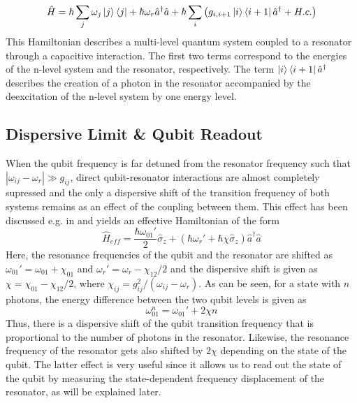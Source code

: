 %
\begin{equation}
\hat{H} = \hbar \sum\limits_j \omega_j \left| j \right>\left< j \right|+\hbar \omega_r \hat{a}^\dagger \hat{a} + \hbar \sum\limits_i \left(g_{i,i+1} \left| i \right>\left< i+1 \right|\hat{a}^\dagger +H.c.\right) \label{eq:cqed_rotating_wave}
\end{equation}
%
This Hamiltonian describes a multi-level quantum system coupled to a resonator through a capacitive interaction. The first two terms correspond to the energies of the n-level system and the resonator, respectively. The term $\left| i \right>\left< i+1 \right|\hat{a}^\dagger$ describes the creation of a photon in the resonator accompanied by the deexcitation of the n-level system by one energy level.

\subsection{Dispersive Limit \& Qubit Readout}

When the qubit frequency is far detuned from the resonator frequency such that $|\omega_{ij}-\omega_r| \gg g_{ij}$, direct qubit-resonator interactions are almost completely supressed and the only a dispersive shift of the transition frequency of both systems remains as an effect of the coupling between them. This effect has been discussed e.g. in \cite{koch_charge-insensitive_2007} and yields an effective Hamiltonian of the form
%
\begin{equation}
\hat{H}_{eff} = \frac{\hbar\omega_{01}'}{2}\hat{\sigma}_z+(\hbar\omega_r'+\hbar \chi \hat{\sigma}_z)\hat{a}^\dagger \hat{a}
\end{equation}
%
Here, the resonance frequencies of the qubit and the resonator are shifted as $\omega_{01}'=\omega_{01}+\chi_{01}$ and $\omega_r' = \omega_{r}-\chi_{12}/2$ and the dispersive shift is given as $\chi=\chi_{01}-\chi_{12}/2$, where $\chi_{ij}=g_{ij}^2/(\omega_{ij}-\omega_r)$. As can be seen, for a state with $n$ photons, the energy difference between the two qubit levels is given as
%
\begin{equation}
\omega_{01}^n = \omega_{01}'+2\chi n
\end{equation}
%
Thus, there is a dispersive shift of the qubit transition frequency that is proportional to the number of photons in the resonator. Likewise, the resonance frequency of the resonator gets also shifted by $2\chi$ depending on the state of the qubit. The latter effect is very useful since it allows us to read out the state of the qubit by measuring the state-dependent frequency displacement of the resonator, as will be explained later.

